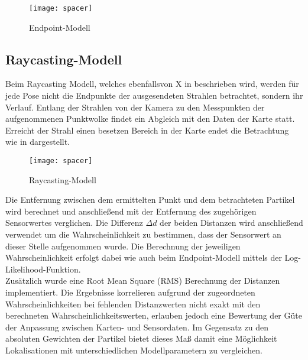 
\begin{figure}[!ht]
	\begin{center}
		\texttt{[image: spacer]}
		\caption{Endpoint-Modell}
		\label{fig.endpoint}
	\end{center}
\end{figure}

\subsection{Raycasting-Modell}
Beim Raycasting Modell, welches ebenfalls von X in \cite{Raycasting} beschrieben wird, werden für jede Pose nicht die Endpunkte der ausgesendeten Strahlen betrachtet, sondern ihr Verlauf. Entlang der Strahlen von der Kamera zu den Messpunkten der aufgenommenen Punktwolke findet ein Abgleich mit den Daten der Karte statt. Erreicht der Strahl einen besetzen Bereich in der Karte endet die Betrachtung wie in  dargestellt.\\

\begin{figure}[!ht]
	\begin{center}
		\texttt{[image: spacer]}
		\caption{Raycasting-Modell}
		\label{fig.raycast}
	\end{center}
\end{figure}

Die Entfernung zwischen dem ermittelten Punkt und dem betrachteten Partikel wird berechnet und anschließend mit der Entfernung des zugehörigen Sensorwertes verglichen. Die Differenz $\Delta d$ der beiden Distanzen wird anschließend verwendet um die Wahrscheinlichkeit zu bestimmen, dass der Sensorwert an dieser Stelle aufgenommen wurde. Die Berechnung der jeweiligen Wahrscheinlichkeit erfolgt dabei wie auch beim Endpoint-Modell mittels der Log-Likelihood-Funktion.\\

Zusätzlich wurde eine Root Mean Square (RMS) Berechnung der Distanzen implementiert. Die Ergebnisse korrelieren aufgrund der zugeordneten Wahrscheinlichkeiten bei fehlenden Distanzwerten nicht exakt mit den berechneten Wahrscheinlichkeitswerten, erlauben jedoch eine Bewertung der Güte der Anpassung zwischen Karten- und Sensordaten. Im Gegensatz zu den absoluten Gewichten der Partikel bietet dieses Maß damit eine Möglichkeit Lokalisationen mit unterschiedlichen Modellparametern zu vergleichen.\\

